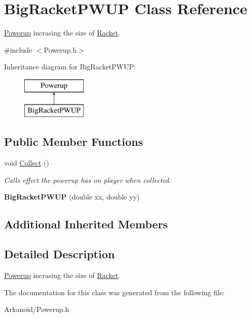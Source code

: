 \hypertarget{class_big_racket_p_w_u_p}{}\section{Big\+Racket\+P\+W\+UP Class Reference}
\label{class_big_racket_p_w_u_p}


\hyperlink{class_powerup}{Powerup} incrasing the size of \hyperlink{class_racket}{Racket}.  




{\ttfamily \#include $<$Powerup.\+h$>$}

Inheritance diagram for Big\+Racket\+P\+W\+UP\+:\begin{figure}[H]
\begin{center}
\leavevmode
\includegraphics[height=2.000000cm]{class_big_racket_p_w_u_p}
\end{center}
\end{figure}
\subsection*{Public Member Functions}
\begin{DoxyCompactItemize}
\item 
\mbox{\label{class_big_racket_p_w_u_p_aac3ff0b2045f8b7b044ad3237f9fb131}} 
void \hyperlink{class_big_racket_p_w_u_p_aac3ff0b2045f8b7b044ad3237f9fb131}{Collect} ()
\begin{DoxyCompactList}\small\item\em Calls effect the powerup has on player when collected. \end{DoxyCompactList}\item 
\mbox{\label{class_big_racket_p_w_u_p_a7bba1be71589caf1f8a5a3ca92b01485}} 
{\bfseries Big\+Racket\+P\+W\+UP} (double xx, double yy)
\end{DoxyCompactItemize}
\subsection*{Additional Inherited Members}


\subsection{Detailed Description}
\hyperlink{class_powerup}{Powerup} incrasing the size of \hyperlink{class_racket}{Racket}. 

The documentation for this class was generated from the following file\+:\begin{DoxyCompactItemize}
\item 
Arkanoid/Powerup.\+h\end{DoxyCompactItemize}
